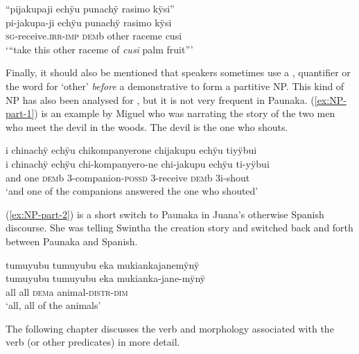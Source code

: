 \ea\label{ex:complNP-3}
\begingl
\glpreamble “pijakupaji echÿu punachÿ rasimo kÿsi”\\
\gla pi-jakupa-ji echÿu punachÿ rasimo kÿsi\\
\textsc{sg}-receive.\textsc{irr}-\textsc{imp} \textsc{dem}b other raceme cusi\\
\glft ‘“take this other raceme of \textit{cusi} palm fruit”’
\endgl
\trailingcitation{[mox-n110920l.105]}
\xe

Finally, it should also be mentioned that speakers sometimes use a , quantifier or the word for ‘other’ \textit{before} a demonstrative to form a partitive NP. This kind of NP has also been analysed for  \citep[cf.][125]{Danielsen2007}, but it is not very frequent in Paunaka. (\ref{ex:NP-part-1}) is an example by Miguel who was narrating the story of the two men who meet the devil in the woods. The devil is the one who shouts.

\ea\label{ex:NP-part-1}
\begingl
\glpreamble i chinachÿ echÿu chikompanyerone chijakupu echÿu tiyÿbui\\
\gla i chinachÿ echÿu chi-kompanyero-ne chi-jakupu echÿu ti-yÿbui\\
\glb and one \textsc{dem}b 3-companion-\textsc{possd} 3-receive \textsc{dem}b 3i-shout\\
\glft ‘and one of the companions answered the one who shouted’
\endgl
\trailingcitation{[mxx-n101017s-1.021]}
\xe

(\ref{ex:NP-part-2}) is a short switch to Paunaka in Juana’s otherwise Spanish discourse. She was telling Swintha the creation story and switched back and forth between Paunaka and Spanish.

\ea\label{ex:NP-part-2}
\begingl
\glpreamble tumuyubu tumuyubu eka mukiankajanemÿnÿ\\
\gla tumuyubu tumuyubu eka mukianka-jane-mÿnÿ\\
\glb all all \textsc{dem}a animal-\textsc{distr}-\textsc{dim}\\
\glft ‘all, all of the animals’
\endgl
\trailingcitation{[jxx-n101013s-1.696]}
\xe
{}

The following chapter discusses the verb and morphology associated with the verb (or other predicates) in more detail.




